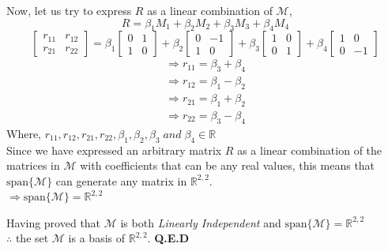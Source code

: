 \documentclass[a4paper]{article}
\begin{document}
\begin{qalist}
			Now, let us try to express $R$ as a linear combination of $\mathcal{M}$, 
			\begin{equation}
				R = {\beta}_{1}{M}_{1} + {\beta}_{2}{M}_{2} + {\beta}_{3}{M}_{3} + {\beta}_{4}{M}_{4}
			\end{equation}
			\begin{equation}
				\begin{bmatrix}{r}_{11} & {r}_{12} \\ {r}_{21} & {r}_{22} \end{bmatrix} = {\beta}_{1}\begin{bmatrix}0 & 1 \\ 1 & 0\end{bmatrix} + {\beta}_{2}\begin{bmatrix}0 & -1 \\ 1 & 0\end{bmatrix} + {\beta}_{3}\begin{bmatrix}1 & 0 \\ 0 & 1\end{bmatrix} + {\beta}_{4}\begin{bmatrix}1 & 0 \\ 0 & -1\end{bmatrix}
			\end{equation}
			\begin{align}
				\Rightarrow {r}_{11} = {\beta}_{3} + {\beta}_{4} \\
				\Rightarrow {r}_{12} = {\beta}_{1} - {\beta}_{2} \\
				\Rightarrow {r}_{21} = {\beta}_{1} + {\beta}_{2} \\
				\Rightarrow {r}_{22} = {\beta}_{3} - {\beta}_{4}
			\end{align}
			Where, ${r}_{11}, {r}_{12}, {r}_{21}, {r}_{22}, {\beta}_{1}, {\beta}_{2}, {\beta}_{3}\; and\; {\beta}_{4} \in \mathbb{R} $ \\
			Since we have expressed an arbitrary matrix $R$ as a linear combination of the matrices in $\mathcal{M}$ with coefficients that can be any real values, this means that $\text{span}\{\mathcal{M}\}$ can generate any matrix in $\mathbb{R}^{2,2}$. \\
			$\Rightarrow\text{span}\{\mathcal{M}\} = \mathbb{R}^{2,2}$
			
			Having proved that $\mathcal{M}$ is both \textit{Linearly Independent} and $\text{span}\{\mathcal{M}\} = \mathbb{R}^{2,2}$ \\
			$\therefore$ the set $\mathcal{M}$ is a basis of ${\mathbb{R}}^{2,2}$. \textbf{Q.E.D}
						

\end{qalist}
\end{document}
